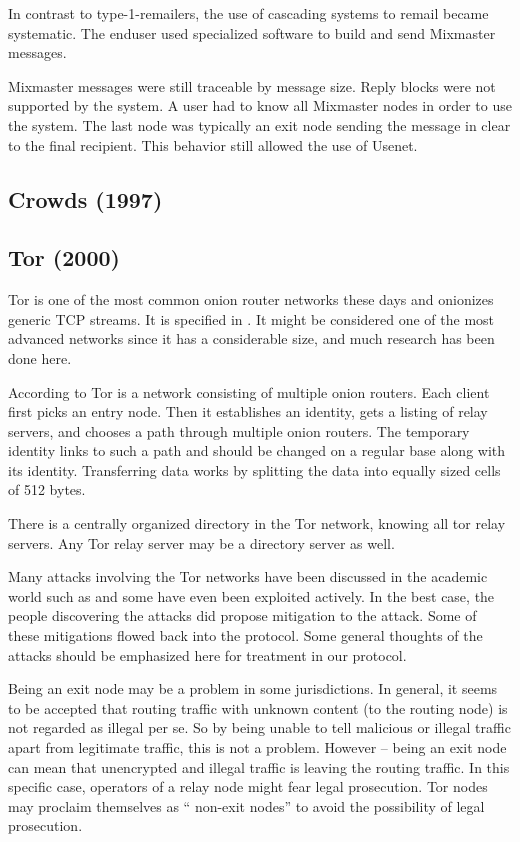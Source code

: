 In contrast to type-1-remailers, the use of cascading systems to remail became systematic. The enduser used specialized software to build and send Mixmaster messages.

Mixmaster messages were still traceable by message size. Reply blocks were not supported by the system. A user had to know all Mixmaster nodes in order to use the system. The last node was typically an exit node sending the message in clear to the final recipient. This behavior still allowed the use of Usenet.

\subsection{Crowds (1997)}



\subsection{Tor (2000)\label{sec:tor}}
Tor is one of the most common onion router networks these days and onionizes generic TCP streams. It is specified in \cite{tor-spec}. It might be considered one of the most advanced networks since it has a considerable size, and much research has been done here.

According to \cite{onion-routing:pet2000} Tor is a network consisting of multiple onion routers. Each client first picks an entry node. Then it establishes an identity, gets a listing of relay servers, and chooses a path through multiple onion routers. The temporary identity links to such a path and should be changed on a regular base along with its identity. Transferring data works by splitting the data into equally sized cells of 512 bytes.

There is a centrally organized directory in the Tor network, knowing all tor relay servers. Any Tor relay server may be a directory server as well. 

Many attacks involving the Tor networks have been discussed in the academic world such as \cite{hs-attack06,esorics13-cellflood,bauer:wpes2007,esorics12-torscan,oakland2013-trawling,danner-et-al:tissec12,congestion-longpaths} and some have even been exploited actively. In the best case, the people discovering the attacks did propose mitigation to the attack. Some of these mitigations flowed back into the protocol. Some general thoughts of the attacks should be emphasized here for treatment in our protocol.

Being an exit node may be a problem in some jurisdictions. In general, it seems to be accepted that routing traffic with unknown content (to the routing node) is not regarded as illegal per se. So by being unable to tell malicious or illegal traffic apart from legitimate traffic, this is not a problem. However -- being an exit node can mean that unencrypted and illegal traffic is leaving the routing traffic. In this specific case, operators of a relay node might fear legal prosecution. Tor nodes may proclaim themselves as  `` non-exit nodes''  to avoid the possibility of legal prosecution.

